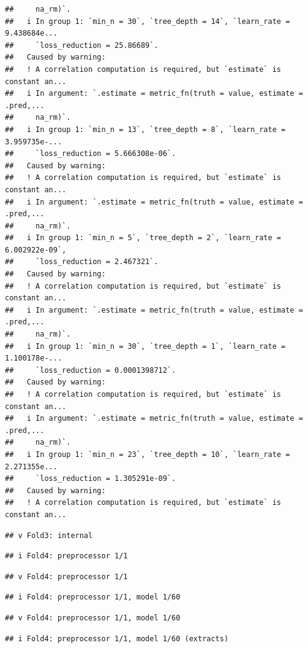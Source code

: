 \documentclass[
]{article}
\begin{document}
\begin{verbatim}
##     na_rm)`.
##   i In group 1: `min_n = 30`, `tree_depth = 14`, `learn_rate = 9.438684e...
##     `loss_reduction = 25.86689`.
##   Caused by warning:
##   ! A correlation computation is required, but `estimate` is constant an...
##   i In argument: `.estimate = metric_fn(truth = value, estimate = .pred,...
##     na_rm)`.
##   i In group 1: `min_n = 13`, `tree_depth = 8`, `learn_rate = 3.959735e-...
##     `loss_reduction = 5.666308e-06`.
##   Caused by warning:
##   ! A correlation computation is required, but `estimate` is constant an...
##   i In argument: `.estimate = metric_fn(truth = value, estimate = .pred,...
##     na_rm)`.
##   i In group 1: `min_n = 5`, `tree_depth = 2`, `learn_rate = 6.002922e-09`,
##     `loss_reduction = 2.467321`.
##   Caused by warning:
##   ! A correlation computation is required, but `estimate` is constant an...
##   i In argument: `.estimate = metric_fn(truth = value, estimate = .pred,...
##     na_rm)`.
##   i In group 1: `min_n = 30`, `tree_depth = 1`, `learn_rate = 1.100178e-...
##     `loss_reduction = 0.0001398712`.
##   Caused by warning:
##   ! A correlation computation is required, but `estimate` is constant an...
##   i In argument: `.estimate = metric_fn(truth = value, estimate = .pred,...
##     na_rm)`.
##   i In group 1: `min_n = 23`, `tree_depth = 10`, `learn_rate = 2.271355e...
##     `loss_reduction = 1.305291e-09`.
##   Caused by warning:
##   ! A correlation computation is required, but `estimate` is constant an...
\end{verbatim}

\begin{verbatim}
## v Fold3: internal
\end{verbatim}

\begin{verbatim}
## i Fold4: preprocessor 1/1
\end{verbatim}

\begin{verbatim}
## v Fold4: preprocessor 1/1
\end{verbatim}

\begin{verbatim}
## i Fold4: preprocessor 1/1, model 1/60
\end{verbatim}

\begin{verbatim}
## v Fold4: preprocessor 1/1, model 1/60
\end{verbatim}

\begin{verbatim}
## i Fold4: preprocessor 1/1, model 1/60 (extracts)
\end{verbatim}
\end{document}
